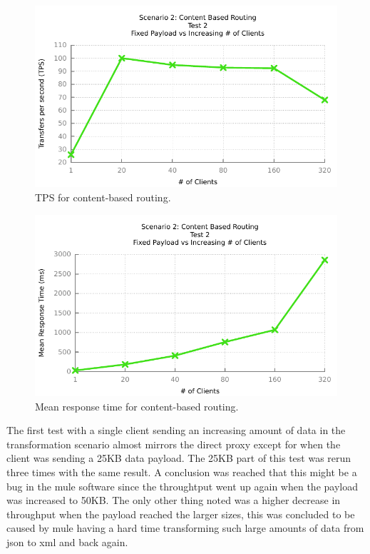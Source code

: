 \begin{figure}[H]
	\caption{TPS for content-based routing.}
	\centerline{\includegraphics{img/mediation_fp_iu_tps}}
	\label{fig:mediation-2-1}
\end{figure}

\begin{figure}[H]
	\caption{Mean response time for content-based routing.}
	\centerline{\includegraphics{img/mediation_fp_iu_resp}}
	\label{fig:mediation-2-2}
\end{figure}

The first test with a single client sending an increasing amount of data in the transformation scenario almost mirrors the direct proxy except for when the client was sending a 25KB data payload. The 25KB part of this test was rerun three times with the same result.
A conclusion was reached that this might be a bug in the mule software since the throughtput went up again when the payload was increased to 50KB.
The only other thing noted was a higher decrease in throughput when the payload reached the larger sizes, this was concluded to be caused by mule having a hard time transforming such large amounts of data from json to xml and back again.

